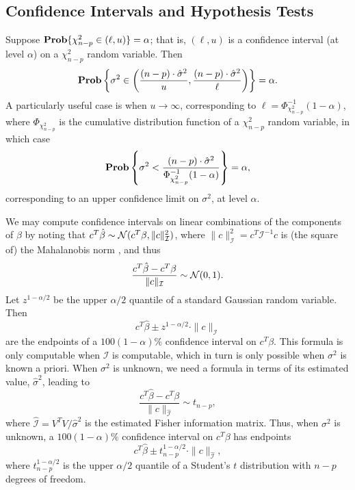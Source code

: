 \documentclass[12pt]{article}
\begin{document}
\subsection{Confidence Intervals and Hypothesis Tests \label{sec:CIHT}}
Suppose $\mathop{\bf Prob}\{ \chi_{n-p}^2 \in (\ell, u) \} = \alpha$; that is, $(\ell, u)$ is a confidence interval (at level $\alpha$) on a $\chi_{n-p}^2$ random variable. Then 
\begin{equation}
   \mathop{\bf Prob} \left\{ \sigma^2 \in \left( \frac{(n-p) \cdot \hat{\sigma}^2}{u}, \frac{(n-p) \cdot \hat{\sigma}^2}{\ell} \right) \right\} = \alpha.
\end{equation}
A particularly useful case is when $u \to \infty$, corresponding to $\ell = \Phi_{\chi_{n-p}^2}^{-1}(1 - \alpha)$, where $\Phi_{\chi_{n-p}^2}$ is the cumulative distribution function of a $\chi_{n-p}^2$ random variable, in which case 
\begin{displaymath}
   \mathop{\bf Prob}\left\{\sigma^2 < \frac{(n-p) \cdot \hat{\sigma}^2}{\Phi_{\chi_{n-p}^2}^{-1}(1 - \alpha)} \right\} = \alpha,
\end{displaymath}
corresponding to an upper confidence limit on $\sigma^2$, at level $\alpha$.

We may compute confidence intervals on linear combinations of the components of $\beta$ by noting that $c^T \hat{\beta} \sim {\mathcal N} (c^T \beta, \| c \|_\mathcal{I}^2)$, where $\| c \|_\mathcal{I}^2 = c^T \mathcal{I}^{-1} c$ is (the square of) the Mahalanobis norm \cite[\S~3.11.1]{Seber:2003}, and thus
\begin{equation}
\label{eqn:dist_ctbeta}
   \frac{c^T \hat{\beta} - c^T \beta}{\|c\|_\mathcal{I}} \sim {\mathcal N}(0, 1).
\end{equation}
Let $z^{1-\alpha/2}$ be the upper $\alpha/2$ quantile of a standard Gaussian random variable. Then
\begin{equation}
\label{eqn:ci_beta}
c^T \hat{\beta} \pm z^{1-\alpha/2} \cdot \|c\|_\mathcal{I}
\end{equation}
are the endpoints of a $100(1-\alpha)\%$ confidence interval on $c^T \beta$. This formula is only computable when $\mathcal{I}$ is computable, which in turn is only possible when $\sigma^2$ is known a priori. When $\sigma^2$ is unknown, we need a formula in terms of its estimated value, $\hat{\sigma}^2$, leading to
\begin{displaymath}
   \frac{c^T \hat{\beta} - c^T \beta}{\| c \|_{\hat{\mathcal{I}}}} \sim t_{n-p},
\end{displaymath}
where $\hat{\mathcal{I}} = V^T V / \hat{\sigma}^2$ is the estimated Fisher information matrix. Thus, when $\sigma^2$ is unknown, a $100(1-\alpha)\%$ confidence interval on $c^T \beta$ has endpoints
\begin{equation}
\label{eqn:ci_beta_estimated_variance}
c^T \hat{\beta} \pm t_{n-p}^{1-\alpha/2} \cdot \| c \|_{\hat{\mathcal{I}}},
\end{equation}
where $t_{n-p}^{1-\alpha/2}$ is the upper $\alpha/2$ quantile of a Student's $t$ distribution with $n-p$ degrees of freedom.
\end{document}
